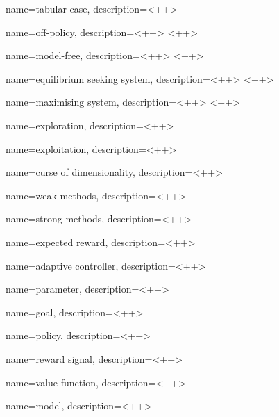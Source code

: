 {
    name={tabular case},
    description={}<++>
}

{
    name=off-policy,
    description={}<++>
}<++>

{
    name=model-free,
    description={}<++>
}<++>

{
    name={equilibrium seeking system},
    description={}<++>
}<++>

{
    name={maximising system},
    description={}<++>
}<++>

{
    name={exploration},
    description={}<++>
}

{
    name={exploitation},
    description={}<++>
}

{
    name={curse of dimensionality},
    description={}<++>
}

{
    name={weak methods},
    description={}<++>
}

{
    name={strong methods},
    description={}<++>
}

{
    name={expected reward},
    description={}<++>
}

{
    name={adaptive controller},
    description={}<++>
}

{
    name={parameter},
    description={}<++>
}

{
    name={goal},
    description={}<++>
}

{
    name={policy},
    description={}<++>
}

{
    name={reward signal},
    description={}<++>
}

{
    name={value function},
    description={}<++>
}

{
    name={model},
    description={}<++>
}

